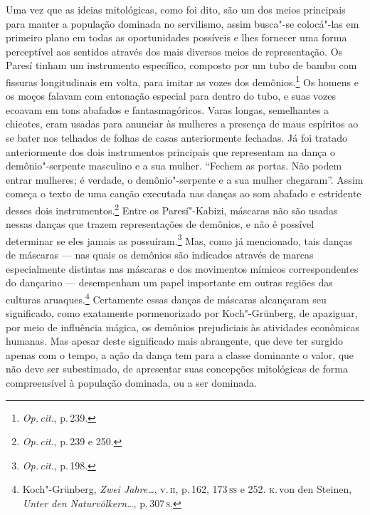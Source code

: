 Uma vez que as ideias mitológicas, como foi dito, são um dos meios
principais para manter a população dominada no servilismo, assim
busca"-se colocá"-las em primeiro plano em todas as oportunidades
possíveis e lhes fornecer uma forma perceptível aos sentidos através dos
mais diversos meios de representação. Os Paresí tinham um instrumento
específico, composto por um tubo de bambu com fissuras longitudinais em
volta, para imitar as vozes dos demônios.\footnote{\textit{Op.\,cit}., p.\,239.} Os
homens e os moços falavam com entonação especial para dentro do tubo, e
suas vozes ecoavam em tons abafados e fantasmagóricos. Varas longas,
semelhantes a chicotes, eram usadas para anunciar às mulheres a presença
de maus espíritos ao se bater nos telhados de folhas de casas
anteriormente fechadas. Já foi tratado anteriormente dos dois instrumentos
principais que representam na dança o demônio"-serpente masculino e a sua
mulher. ``Fechem as portas. Não podem entrar mulheres; é verdade, o
demônio"-serpente e a sua mulher chegaram''. Assim começa o texto de uma
canção executada nas danças ao som abafado e estridente desses
dois instrumentos.\footnote{\textit{Op.\,cit}., p.\,239 e 250.} Entre os
Paresí"-Kabizi, máscaras não são usadas nessas danças que trazem
representações de demônios, e não é possível determinar se eles jamais
as possuíram.\footnote{\textit{Op.\,cit}., p.\,198.} Mas, como já mencionado, tais
danças de máscaras --- nas quais os demônios são indicados através de
marcas especialmente distintas nas máscaras e dos movimentos mímicos
correspondentes do dançarino --- desempenham um papel importante em
outras regiões das culturas aruaques.\footnote{Koch"-Grünberg, \textit{Zwei
  Jahre\ldots}, v.\,\textsc{ii}, p.\,162, 173\,\textsc{ss} e 252. \textsc{k}.\,von den
  Steinen, \textit{Unter den Naturvölkern\ldots}, p.\,307\,\textsc{s}.}
Certamente essas danças de máscaras alcançaram seu significado, como
exatamente pormenorizado por Koch"-Grünberg, de apaziguar, por meio de
influência mágica, os demônios prejudiciais às atividades econômicas
humanas. Mas apesar deste significado mais abrangente, que deve ter
surgido apenas com o tempo, a ação da dança tem para a classe dominante
o valor, que não deve ser subestimado, de apresentar suas concepções
mitológicas de forma compreensível à população dominada, ou a ser dominada.

